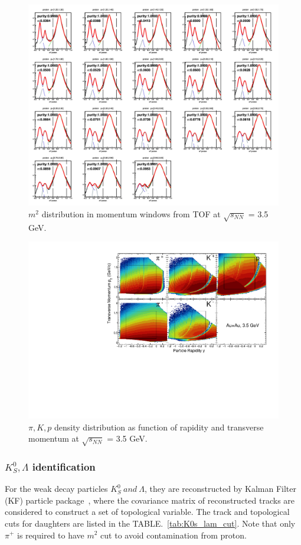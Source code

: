\begin{figure}[hbt!]
\centering
\includegraphics[width=0.55\linewidth]{figures/chapter02/m2_p_3p5gev.png}
\caption{$m^2$ distribution in momentum windows from TOF at $\sqrt{s_{NN}}$ = 3.5 GeV.}
\label{fig:m2_p_3p5}
\end{figure}

\begin{figure}[hbt!]
\centering
\includegraphics[width=0.55\linewidth]{figures/chapter02/3p5_piKp_acceptance.pdf}
\caption{$\pi, K, p$ density distribution as function of rapidity and transverse momentum at $\sqrt{s_{NN}}$ = 3.5 GeV.}
\label{fig:3p5_piKp_acceptance}
\end{figure}


\subsubsection{$K^{0}_{S}, \Lambda$ identification}

For the weak decay particles $K^{0}_{S}~and~\Lambda$, they are reconstructed by Kalman Filter (KF) particle package~\cite{doi:10.1142/S0217751X20430034},
where the covariance matrix of reconstructed tracks are considered to construct a set of topological variable.
The track and topological cuts for daughters are listed in the TABLE.~\ref{tab:K0s_lam_cut}.
Note that only $\pi^{+}$ is required to have $m^2$ cut to avoid contamination from proton.

